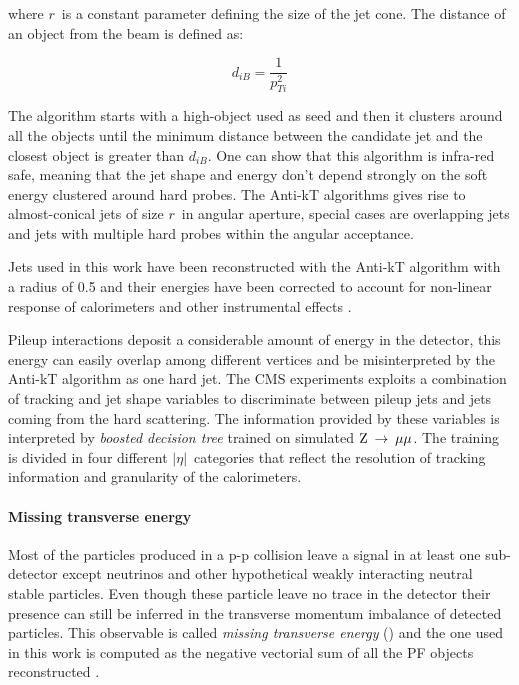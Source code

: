 where $r$\ is a constant parameter defining the size of the jet cone.
The distance of an object from  the beam is defined as:

\begin{equation}
d_{iB} = \dfrac{1}{p_{Ti}^2}
\end{equation}

The algorithm starts with a high-\pT object used as seed and then it clusters around all the objects until the minimum distance between the candidate jet and the closest object is greater than $d_{iB}$. One can show that this algorithm is infra-red safe, meaning that the jet shape and energy don't depend strongly on the soft energy clustered around hard probes. The Anti-kT algorithms gives rise to almost-conical jets of size $r$\ in angular aperture, special cases are overlapping jets and jets with multiple hard probes within the angular acceptance.

Jets used in this work have been reconstructed with the Anti-kT algorithm with a radius of 0.5 and their energies have been corrected to account for non-linear response of calorimeters and other instrumental effects \cite{Chatrchyan:2011ds}.

Pileup interactions deposit a considerable amount of energy in the detector, this energy can easily overlap among different vertices and be misinterpreted by the Anti-kT algorithm as one hard jet. The CMS experiments exploits a combination of tracking and jet shape variables to discriminate between pileup jets and jets coming from the hard scattering. The information provided by these variables is interpreted by \emph{boosted decision tree} \cite{CMS-PAS-JME-13-005} trained on simulated $\mathrm{Z}\:\rightarrow\:\mu\mu$. The training is divided in four different $|\eta|$\ categories that reflect the resolution of tracking information and granularity of the calorimeters.

\paragraph{Missing transverse energy}

Most of the particles produced in a p-p collision leave a signal in at least one sub-detector except neutrinos and other hypothetical weakly interacting neutral stable particles. Even though these particle leave no trace in the detector their presence can still be inferred in the transverse momentum imbalance of detected particles. This observable is called \emph{missing transverse energy} (\MET) and the one used in this work is computed as the negative vectorial sum of all the PF objects reconstructed \cite{CMS-PAS-JME-13-003}. 

